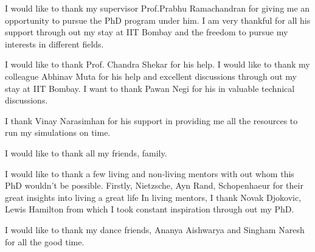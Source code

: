 \acknowledgments

I would like to thank my supervisor Prof.Prabhu Ramachandran for giving me an
opportunity to pursue the PhD program under him. I am very thankful for all his
support through out my stay at IIT Bombay and the freedom to pursue my interests
in different fields.

I would like to thank Prof. Chandra Shekar for his help. I
would like to thank my colleague Abhinav Muta for his help and excellent
discussions through out my stay at IIT Bombay. I want to thank Pawan Negi for
his in valuable technical discussions.

I thank Vinay Narasimhan for his support in providing me all the resources to
run my simulations on time.



I would like to thank all my friends, family.


I would like to thank a few living and non-living mentors with out whom this PhD
wouldn't be possible. Firstly, Nietzsche, Ayn Rand, Schopenhaeur for their great
insights into living a great life
In living mentors, I thank Novak Djokovic, Lewis Hamilton
from which I took constant inspiration through out my PhD.

I would like to thank my dance friends, Ananya Aishwarya and Singham Naresh for
all the good time.


\signature{\today}


